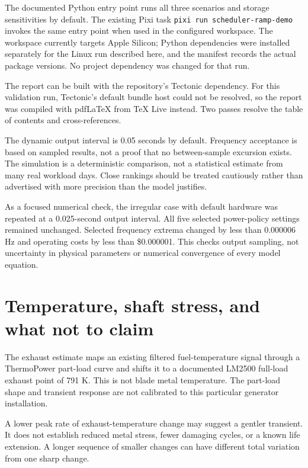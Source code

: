 \documentclass[11pt]{article}
\begin{document}
The documented Python entry point runs all three scenarios and storage
sensitivities by default. The existing Pixi task
\texttt{pixi run scheduler-ramp-demo} invokes the same entry point when
used in the configured workspace. The workspace currently targets
Apple Silicon; Python dependencies were installed separately for the Linux
run described here, and the manifest records the actual package versions.
No project dependency was changed for that run.

The report can be built with the repository's Tectonic dependency.
For this validation run, Tectonic's default bundle host could not be
resolved, so the report was compiled with pdfLaTeX from TeX Live instead.
Two passes resolve the table of contents and cross-references.

The dynamic output interval is 0.05 seconds by default.
Frequency acceptance is based on sampled results, not a proof that no
between-sample excursion exists. The simulation is a deterministic
comparison, not a statistical estimate from many real workload days.
Close rankings should be treated cautiously rather than advertised with
more precision than the model justifies.

As a focused numerical check, the irregular case with default hardware
was repeated at a 0.025-second output interval. All five selected
power-policy settings remained unchanged. Selected frequency extrema
changed by less than $0.000006$ Hz and operating costs by less than
\$0.000001. This checks output sampling, not uncertainty in physical
parameters or numerical convergence of every model equation.

\section{Temperature, shaft stress, and what not to claim}

The exhaust estimate maps an existing filtered fuel-temperature signal
through a ThermoPower part-load curve and shifts it to a documented
LM2500 full-load exhaust point of 791 K. This is not blade metal temperature.
The part-load shape and transient response are not calibrated to this
particular generator installation.

A lower peak rate of exhaust-temperature change may suggest a gentler
transient. It does not establish reduced metal stress, fewer damaging
cycles, or a known life extension. A longer sequence of smaller changes
can have different total variation from one sharp change.
\end{document}
